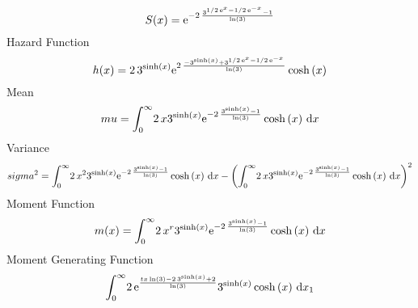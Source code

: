 \documentclass[12pt]{article}
\begin{document}
 $$ S(x)={{\rm e}^{-2\,{\frac {{3}^{1/2\,{{\rm e}^{x}}-1/2\,{{\rm e}^{-x}}}-1}{
\ln  \left( 3 \right) }}}}
$$ Hazard Function 
 $$ h(x)=2\,{3}^{\sinh \left( x \right) }{{\rm e}^{2\,{\frac {-{3}^{\sinh
 \left( x \right) }+{3}^{1/2\,{{\rm e}^{x}}-1/2\,{{\rm e}^{-x}}}}{\ln 
 \left( 3 \right) }}}}\cosh \left( x \right) 
$$Mean 
 $$ mu=\int_{0}^{\infty }\!2\,x{3}^{\sinh \left( x \right) }{{\rm e}^{-2\,{
\frac {{3}^{\sinh \left( x \right) }-1}{\ln  \left( 3 \right) }}}}
\cosh \left( x \right) \,{\rm d}x
$$ Variance 
 $$ sigma^2 = \int_{0}^{\infty }\!2\,{x}^{2}{3}^{\sinh \left( x \right) }{{\rm e}^{-
2\,{\frac {{3}^{\sinh \left( x \right) }-1}{\ln  \left( 3 \right) }}}}
\cosh \left( x \right) \,{\rm d}x- \left( \int_{0}^{\infty }\!2\,x{3}^
{\sinh \left( x \right) }{{\rm e}^{-2\,{\frac {{3}^{\sinh \left( x
 \right) }-1}{\ln  \left( 3 \right) }}}}\cosh \left( x \right) 
\,{\rm d}x \right) ^{2}
$$Moment Function 
 $$ m(x) = \int_{0}^{\infty }\!2\,{x}^{r}{3}^{\sinh \left( x \right) }{{\rm e}^{-
2\,{\frac {{3}^{\sinh \left( x \right) }-1}{\ln  \left( 3 \right) }}}}
\cosh \left( x \right) \,{\rm d}x
$$ Moment Generating Function 
 $$\int_{0}^{\infty }\!2\,{{\rm e}^{{\frac {tx\ln  \left( 3 \right) -2\,{
3}^{\sinh \left( x \right) }+2}{\ln  \left( 3 \right) }}}}{3}^{\sinh
 \left( x \right) }\cosh \left( x \right) \,{\rm d}x_{{1}}
$$
\end{document}
